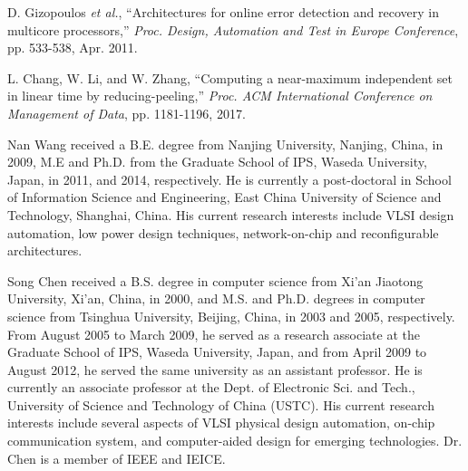 \documentclass[10pt,journal]{IEEEtran}
\begin{document}
\begin{thebibliography}{99}
D. Gizopoulos \textit{et al.}, ``Architectures for online error detection and recovery in multicore processors,'' \textit{Proc. Design, Automation and Test in Europe Conference}, pp. 533-538, Apr. 2011.


L. Chang, W. Li, and W. Zhang,  ``Computing a near-maximum independent set in linear time by reducing-peeling,'' \textit{Proc. ACM International Conference on Management of Data}, pp. 1181-1196, 2017.


\end{thebibliography}

%

\begin{IEEEbiography}{Nan Wang}
received a B.E. degree from Nanjing University, Nanjing, China, in 2009, M.E and Ph.D. from the Graduate School of IPS, Waseda University, Japan, in 2011, and 2014, respectively. He is currently a post-doctoral in School of Information Science and Engineering, East China University of Science and Technology, Shanghai, China. His current research interests include VLSI design automation, low power design techniques, network-on-chip and reconfigurable architectures.
\end{IEEEbiography}

\begin{IEEEbiography}{Song Chen}
received a B.S. degree in computer science from Xi'an Jiaotong University, Xi'an, China, in 2000, and M.S. and Ph.D. degrees in computer science from Tsinghua University, Beijing, China, in 2003 and 2005, respectively. From August 2005 to March 2009, he served as a research associate at the Graduate School of IPS, Waseda University, Japan, and from April 2009 to August 2012, he served the same university as an assistant professor. He is currently an associate professor at the Dept. of Electronic Sci. and Tech., University of Science and Technology of China (USTC). His current research interests include several aspects of VLSI physical design automation, on-chip communication system, and computer-aided design for emerging technologies. Dr. Chen is a member of IEEE and IEICE.
\end{IEEEbiography}
\end{document}
